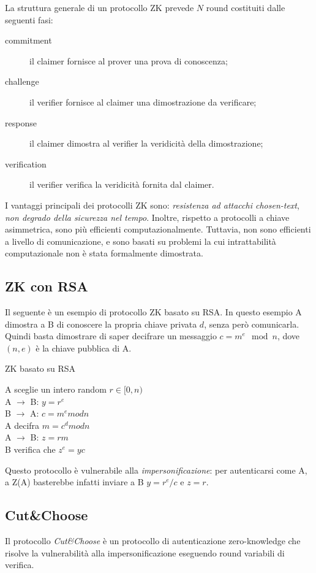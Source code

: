 La struttura generale di un protocollo ZK prevede $N$ round costituiti dalle seguenti fasi:
\begin{description}
  \item[commitment] il claimer fornisce al prover una prova di conoscenza;
  \item[challenge] il verifier fornisce al claimer una dimostrazione da verificare;
  \item[response] il claimer dimostra al verifier la veridicità della dimostrazione;
  \item[verification] il verifier verifica la veridicità fornita dal claimer.
\end{description}

I vantaggi principali dei protocolli ZK sono: \textit{resistenza ad attacchi chosen-text}, \textit{non degrado della sicurezza nel tempo}. Inoltre, rispetto a protocolli a chiave asimmetrica, sono più efficienti computazionalmente.
Tuttavia, non sono efficienti a livello di comunicazione, e sono basati su problemi la cui intrattabilità computazionale non è stata formalmente dimostrata.


\subsection{ZK con RSA}
Il seguente è un esempio di protocollo ZK basato su RSA. In questo esempio A dimostra a B di conoscere la propria chiave privata $d$, senza però comunicarla. Quindi basta dimostrare di saper decifrare un messaggio $c=m^{e} \mod n$, dove $(n,e)$ è la chiave pubblica di A.

\bigskip
\begin{algorithm}[H]
  \caption{ZK basato su RSA}
  \label{alg:authentication-zero-knowledge-rsa}
  \SetAlgoNoLine
  A sceglie un intero random $r \in [0,n)$\\
  A $\rightarrow$ B: $y=r^{e}$\\
  B $\rightarrow$ A: $c=m^{e} mod n$\\
  A decifra $m=c^{d} mod n$ \\
  A $\rightarrow$ B: $z=rm$\\
  B verifica che $z^{e}=yc$
\end{algorithm}

Questo protocollo è vulnerabile alla \textit{impersonificazione}: per autenticarsi come A, a Z(A) basterebbe infatti inviare a B $y=r^{e}/c$ e $z=r$.


\subsection{Cut\&Choose}
Il protocollo \textit{Cut\&Choose} è un protocollo di autenticazione zero-knowledge che risolve la vulnerabilità alla impersonificazione eseguendo round variabili di verifica.

